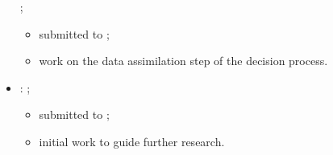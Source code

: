\documentclass[main.tex]{subfiles}
\begin{document}
\begin{itemize}
  \textit{};
  \begin{itemize}
  \item submitted to
    \textit{};
  \item work on the data assimilation step of the decision process.
  \end{itemize}
\item \citet{geer2018dynamic}:
  \textit{};
  \begin{itemize}
  \item submitted to
    \textit{};
  \item initial work to guide further research.
  \end{itemize}
\end{itemize}

\biblio{}
\end{document}

